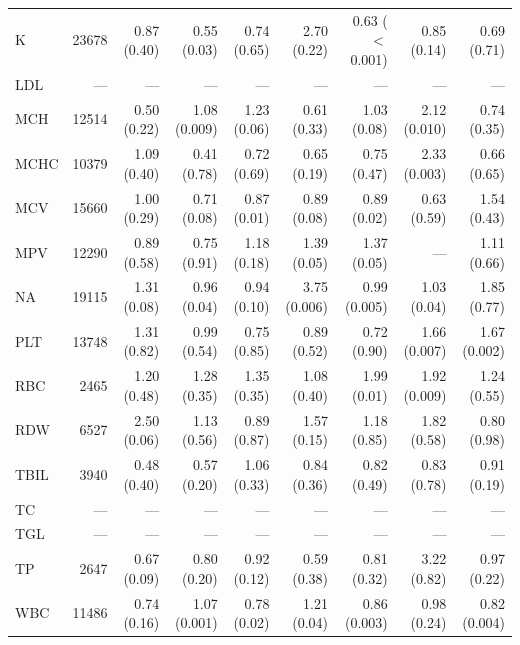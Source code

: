 \begin{table}[ht]
\begin{tabular}{lrrrrrrrr}
K & 23678 & 0.87 (0.40) & 0.55 (0.03) & 0.74 (0.65) & 2.70 (0.22) & 0.63 ($<$0.001) & 0.85 (0.14) & 0.69 (0.71) \\
LDL & --- & --- & --- & --- & --- & --- & --- & --- \\
MCH & 12514 & 0.50 (0.22) & 1.08 (0.009) & 1.23 (0.06) & 0.61 (0.33) & 1.03 (0.08) & 2.12 (0.010) & 0.74 (0.35) \\
MCHC & 10379 & 1.09 (0.40) & 0.41 (0.78) & 0.72 (0.69) & 0.65 (0.19) & 0.75 (0.47) & 2.33 (0.003) & 0.66 (0.65) \\
MCV & 15660 & 1.00 (0.29) & 0.71 (0.08) & 0.87 (0.01) & 0.89 (0.08) & 0.89 (0.02) & 0.63 (0.59) & 1.54 (0.43) \\
MPV & 12290 & 0.89 (0.58) & 0.75 (0.91) & 1.18 (0.18) & 1.39 (0.05) & 1.37 (0.05) & --- & 1.11 (0.66) \\
NA & 19115 & 1.31 (0.08) & 0.96 (0.04) & 0.94 (0.10) & 3.75 (0.006) & 0.99 (0.005) & 1.03 (0.04) & 1.85 (0.77) \\
PLT & 13748 & 1.31 (0.82) & 0.99 (0.54) & 0.75 (0.85) & 0.89 (0.52) & 0.72 (0.90) & 1.66 (0.007) & 1.67 (0.002) \\
RBC & 2465 & 1.20 (0.48) & 1.28 (0.35) & 1.35 (0.35) & 1.08 (0.40) & 1.99 (0.01) & 1.92 (0.009) & 1.24 (0.55) \\
RDW & 6527 & 2.50 (0.06) & 1.13 (0.56) & 0.89 (0.87) & 1.57 (0.15) & 1.18 (0.85) & 1.82 (0.58) & 0.80 (0.98) \\
TBIL & 3940 & 0.48 (0.40) & 0.57 (0.20) & 1.06 (0.33) & 0.84 (0.36) & 0.82 (0.49) & 0.83 (0.78) & 0.91 (0.19) \\
TC & --- & --- & --- & --- & --- & --- & --- & --- \\
TGL & --- & --- & --- & --- & --- & --- & --- & --- \\
TP & 2647 & 0.67 (0.09) & 0.80 (0.20) & 0.92 (0.12) & 0.59 (0.38) & 0.81 (0.32) & 3.22 (0.82) & 0.97 (0.22) \\
WBC & 11486 & 0.74 (0.16) & 1.07 (0.001) & 0.78 (0.02) & 1.21 (0.04) & 0.86 (0.003) & 0.98 (0.24) & 0.82 (0.004) \\
\bottomrule
\end{tabular}
\label{tab:17_incidence_eicu_aki}
\end{table}